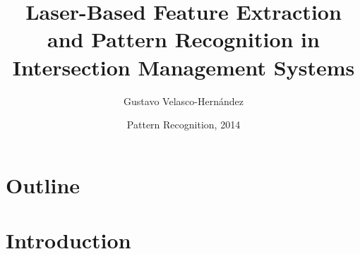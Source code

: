 \documentclass[table]{beamer}
\title[Laser-Based Feature Extraction and Pattern Recognition in IMS]{Laser-Based Feature Extraction and Pattern Recognition in Intersection Management Systems}
\author{Gustavo Velasco-Hernández}
\institute[Universidad del Valle]
{
	
}
\date{Pattern Recognition, 2014}
\begin{document}
\frame{\titlepage}
\section*{Outline}

\frame{\tableofcontents}
\section{Introduction}



\end{document}
